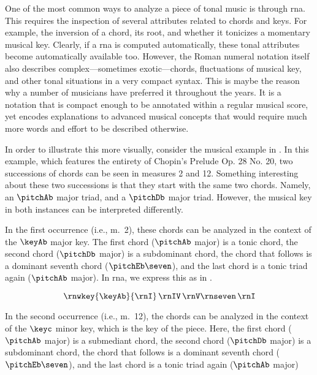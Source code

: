 
One of the most common ways to analyze a piece of tonal
music is through \gls{rna}. This requires the inspection of
several attributes related to chords and keys. For example,
the inversion of a chord, its root, and whether it tonicizes
a momentary musical key. Clearly, if a \gls{rna} is computed
automatically, these tonal attributes become automatically
available too. However, the Roman numeral notation itself
also describes complex---sometimes exotic---chords,
fluctuations of musical key, and other tonal situations in a
very compact syntax. This is maybe the reason why a number
of musicians have preferred it throughout the years. It is a
notation that is compact enough to be annotated within a
regular musical score, yet encodes explanations to advanced
musical concepts that would require much more words and
effort to be described otherwise.

In order to illustrate this more visually, consider the
musical example in . In this
example, which features the entirety of Chopin's Prelude Op.
28 No. 20, two successions of chords can be seen in measures
2 and 12. Something interesting about these two successions
is that they start with the same two chords. Namely, an
$\pitchAb$ major triad, and a $\pitchDb$ major triad.
However, the musical key in both instances can be
interpreted differently. 

In the first occurrence (i.e., m.~2), these chords can be
analyzed in the context of the $\keyAb$ major key. The first
chord ($\pitchAb$ major) is a tonic chord, the second chord
($\pitchDb$ major) is a subdominant chord, the chord that
follows is a dominant seventh chord ($\pitchEb\seven$), and
the last chord is a tonic triad again ($\pitchAb$ major). In
\gls{rna}, we express this as in .

\begin{equation}
    \label{eq:succession1}
    \rnwkey{\keyAb}{\rnI} \, \rnIV \, \rnV\rnseven \, \rnI
\end{equation}

In the second occurrence (i.e., m.~12), the chords can be
analyzed in the context of the $\keyc$ minor key, which is
the key of the piece. Here, the first chord ($\pitchAb$
major) is a submediant chord, the second chord ($\pitchDb$
major) is a subdominant chord, the chord that follows is a
dominant seventh chord ($\pitchEb\seven$), and the last
chord is a tonic triad again ($\pitchAb$ major)

